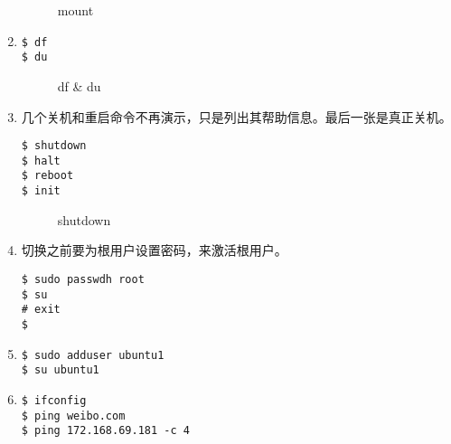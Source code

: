 \documentclass[cs4size,a4paper,nofonts]{ctexart}
\begin{document}
\begin{enumerate}
\begin{figure}[htp]
\caption{\label{fig:mount}mount}
\end{figure}

\item \begin{Verbatim}
$ df
$ du
\end{Verbatim}

\begin{figure}[htp]
\caption{\label{fig:df}df \& du}
\end{figure}

\item 几个关机和重启命令不再演示，只是列出其帮助信息。最后一张是真正关机。
\begin{Verbatim}
$ shutdown
$ halt
$ reboot
$ init
\end{Verbatim}

\begin{figure}[htp]
\centering
{}

\caption{\label{fig:shutdown}shutdown}
\end{figure}

\item 切换之前要为根用户设置密码，来激活根用户。
\begin{Verbatim}
$ sudo passwdh root
$ su
# exit
$
\end{Verbatim}

\begin{figure}[htp]
\end{figure}

\item \begin{Verbatim}
$ sudo adduser ubuntu1
$ su ubuntu1
\end{Verbatim}

\begin{figure}[htp]
\end{figure}

\item \begin{Verbatim}
$ ifconfig
$ ping weibo.com
$ ping 172.168.69.181 -c 4
\end{Verbatim}


\end{enumerate}
\end{document}

